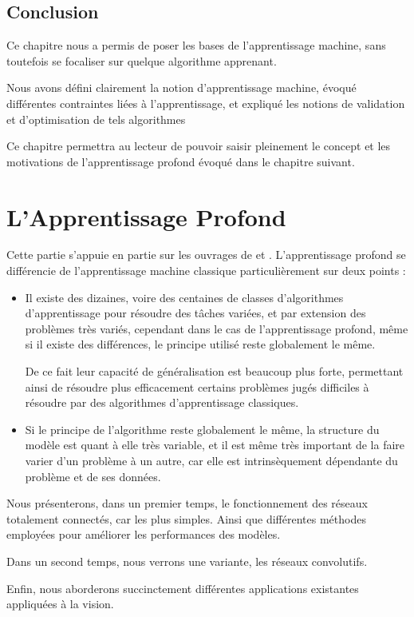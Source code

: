 \documentclass[a4paper, 11pt]{report}
\begin{document}
\section{Conclusion}
Ce chapitre nous a permis de poser les bases de l'apprentissage machine, sans toutefois se focaliser sur quelque algorithme apprenant.

Nous avons défini clairement la notion d'apprentissage machine, évoqué différentes contraintes liées à l'apprentissage, et expliqué les notions de validation et d'optimisation de tels algorithmes

Ce chapitre permettra au lecteur de pouvoir saisir pleinement le concept et les motivations de l'apprentissage profond évoqué dans le chapitre suivant.

\chapter{L'Apprentissage Profond}
Cette partie s'appuie en partie sur les ouvrages de\citep{Goodfellow2016} et \citep{Nielsen2015}.
L'apprentissage profond se différencie de l'apprentissage machine classique particulièrement sur deux points :
\begin{itemize}
	\item Il existe des dizaines, voire des centaines de classes d'algorithmes d'apprentissage pour résoudre des tâches variées, et par extension des problèmes très variés, cependant dans le cas de l'apprentissage profond, même si il existe des différences, le principe utilisé reste globalement le même.
	
	De ce fait leur capacité de généralisation est beaucoup plus forte, permettant ainsi de résoudre plus efficacement certains problèmes jugés difficiles à résoudre par des algorithmes d'apprentissage classiques.
	\item Si le principe de l'algorithme reste globalement le même, la structure du modèle est quant à elle très variable, et il est même très important de la faire varier d'un problème à un autre, car elle est intrinsèquement dépendante du problème et de ses données.
	      \end{itemize}
Nous présenterons, dans un premier temps, le fonctionnement des réseaux totalement connectés, car les plus simples. Ainsi que différentes méthodes employées pour améliorer les performances des modèles.

Dans un second temps, nous verrons une variante, les réseaux convolutifs.

Enfin, nous aborderons succinctement différentes applications existantes appliquées à la vision.
\end{document}
